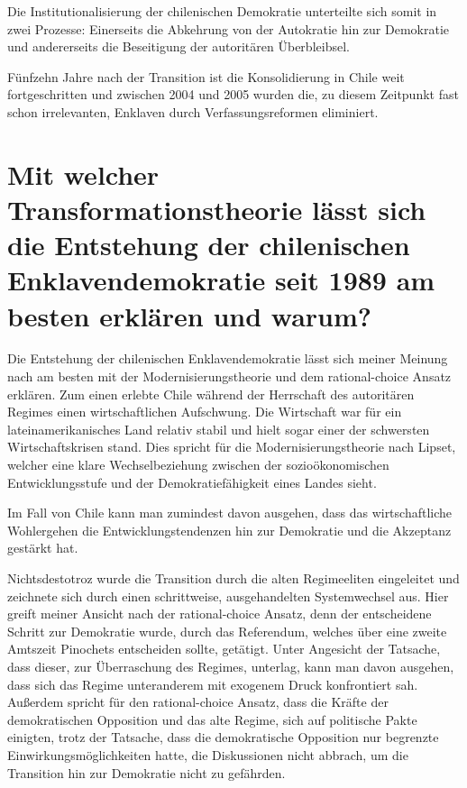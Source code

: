 \documentclass[12pt]{article}
\begin{document}
Die Institutionalisierung der chilenischen Demokratie unterteilte sich somit in zwei Prozesse: Einerseits die Abkehrung von der Autokratie hin zur Demokratie und andererseits die Beseitigung der autoritären Überbleibsel.

Fünfzehn Jahre nach der Transition ist die Konsolidierung in Chile weit fortgeschritten und zwischen 2004 und 2005 wurden die, zu diesem Zeitpunkt fast schon irrelevanten, Enklaven durch Verfassungsreformen eliminiert.

\section{Mit welcher Transformationstheorie lässt sich die Entstehung der chilenischen Enklavendemokratie seit 1989 am besten erklären und warum?}

Die Entstehung der chilenischen Enklavendemokratie lässt sich meiner Meinung nach am besten mit der Modernisierungstheorie und dem rational-choice Ansatz erklären. 
Zum einen erlebte Chile während der Herrschaft des autoritären Regimes einen wirtschaftlichen Aufschwung.
Die Wirtschaft war für ein lateinamerikanisches Land relativ stabil und hielt sogar einer der schwersten Wirtschaftskrisen stand.
Dies spricht für die Modernisierungstheorie nach Lipset, welcher eine klare Wechselbeziehung zwischen der sozioökonomischen Entwicklungsstufe und der Demokratiefähigkeit eines Landes sieht.

Im Fall von Chile kann man zumindest davon ausgehen, dass das wirtschaftliche Wohlergehen die Entwicklungstendenzen hin zur Demokratie und die Akzeptanz gestärkt hat.

Nichtsdestotroz wurde die Transition durch die alten Regimeeliten eingeleitet und zeichnete sich durch einen schrittweise, ausgehandelten Systemwechsel aus.
Hier greift meiner Ansicht nach der rational-choice Ansatz, denn der entscheidene Schritt zur Demokratie wurde, durch das Referendum, welches über eine zweite Amtszeit Pinochets entscheiden sollte, getätigt.
Unter Angesicht der Tatsache, dass dieser, zur Überraschung des Regimes, unterlag, kann man davon ausgehen, dass sich das Regime unteranderem mit exogenem Druck konfrontiert sah. Außerdem spricht für den rational-choice Ansatz, dass die Kräfte der demokratischen Opposition und das alte Regime, sich auf politische Pakte einigten, trotz der Tatsache, dass die demokratische Opposition nur begrenzte Einwirkungsmöglichkeiten hatte, die Diskussionen nicht abbrach, um die Transition hin zur Demokratie nicht zu gefährden.
\end{document}
